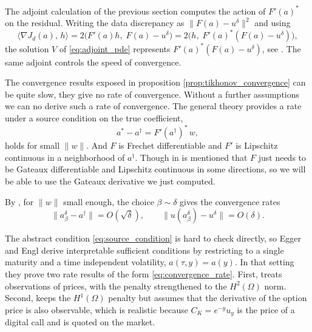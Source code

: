 The adjoint calculation of the previous section computes the action of $F'(a)^*$ on the residual.
Writing the data discrepancy as $\|F(a) - u^\delta\|^2$ and using
\begin{equation*}
    \langle \nabla J_d(a),\, h \rangle
    = 2\bigl(F'(a)h,\; F(a) - u^\delta\bigr)
    = 2\bigl(h,\; F'(a)^*(F(a) - u^\delta)\bigr),
\end{equation*}
the solution $V$ of \eqref{eq:adjoint_pde} represents $F'(a)^*(F(a) - u^\delta)$,
see \cite[Remark 4.2]{egger2005tikhonov}.
The same adjoint controls the speed of convergence.

The convergence results exposed in proposition \ref{prop:tikhonov_convergence} can be quite slow,
they give no rate of convergence.
Without a further assumptions we can no derive such a rate of convergence.
The general theory \cite{engl_hanke_neubauer} provides a rate under a source condition on the true coefficient,
\begin{equation}\label{eq:source_condition}
    a^* - a^\dagger = F'(a^\dagger)^*\,w,
\end{equation}
holds for small $\|w\|$.
And $F$ is Frechet differentiable and $F'$ is Lipschitz continuous in a neighborhood of $a^\dagger$.
Though in \cite{egger2005tikhonov} is mentioned that $F$ just needs to be Gateaux differentiable and Lipschitz continuous in some directions,
so we will be able to use the Gateaux derivative we just computed.

By \cite[Proposition 4.1]{egger2005tikhonov}, for $\|w\|$ small enough,
the choice $\beta \sim \delta$ gives the convergence rates
\begin{equation}\label{eq:convergence_rate}
    \|a^\delta_\beta - a^\dagger\| = O(\sqrt{\delta}),
    \qquad
    \|u(a^\delta_\beta) - u^\delta\| = O(\delta).
\end{equation}

The abstract condition \eqref{eq:source_condition} is hard to check directly,
so Egger and Engl derive interpretable sufficient conditions by restricting to a single maturity and a time independent volatility,
$a(\tau, y) = a(y)$.
In that setting they prove two rate results of the form \eqref{eq:convergence_rate}.
First, \cite[Theorem 4.1]{egger2005tikhonov} treats observations of prices,
with the penalty strengthened to the $H^2(\Omega)$ norm.
Second, \cite[Theorem 4.2]{egger2005tikhonov} keeps the $H^1(\Omega)$ penalty
but assumes that the derivative of the option price is also observable,
which is realistic because $C_K = e^{-y}u_y$ is the price of a digital call and is quoted on the market.


